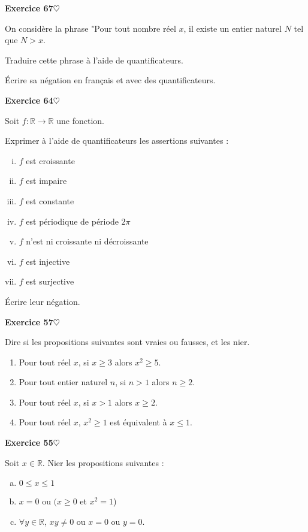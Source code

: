 ﻿\documentclass[11pt,a4paper]{amsart}
\theoremstyle{theorem}
\theoremstyle{definition}
\newcommand{\coeur}{$\heartsuit$}
\def\RR{{\mathbb R}}
\newcounter{qcounter}
\newcounter{qscounter}
\begin{document}
\everymath{\displaystyle}\textbf{Exercice 67}{\coeur}

On considère la phrase "Pour tout nombre réel $x$, il existe un entier naturel $N$ tel que $N>x$.

\question Traduire cette phrase à l'aide de quantificateurs.

\question \'Ecrire sa négation en français et avec des quantificateurs.


\setcounter{qcounter}{0} \setcounter{qscounter}{0}\textbf{Exercice 64}{\coeur}

Soit $f:\RR\to\RR$ une fonction. 

\question Exprimer à l'aide de quantificateurs les assertions suivantes :

\begin{enumerate}[(i)]
\item $f$ est croissante
\item $f$ est impaire
\item $f$ est constante
\item $f$ est périodique de période $2\pi$
\item $f$ n'est ni croissante ni décroissante
\item $f$ est injective
\item $f$ est surjective
\end{enumerate}

\question \'Ecrire leur négation.




\setcounter{qcounter}{0} \setcounter{qscounter}{0}\textbf{Exercice 57}{\coeur}

Dire si les propositions suivantes sont
vraies ou fausses, et les nier.

\begin{enumerate}
\item Pour tout réel $x$, si $x\geq 3$ alors $x^2\geq 5$.
\item Pour tout entier naturel $n$, si $n>1$ alors $n\geq 2$.
\item Pour tout réel $x$, si $x>1$ alors $x\geq 2$.
\item Pour tout réel $x$,  $x^2\geq 1$ est équivalent à $x\leq 1$.
\end{enumerate}

\setcounter{qcounter}{0} \setcounter{qscounter}{0}\textbf{Exercice 55}{\coeur}

Soit $x\in\RR$. Nier les propositions suivantes :

\begin{enumerate}[a)]
\item $0\leq x\leq 1$
\item $x=0$ ou $(x\geq 0$ et $x^2=1$)
\item $\forall y\in\RR$, $xy\neq 0$ ou $x=0$ ou $y=0$.
\end{enumerate}
\end{document}
